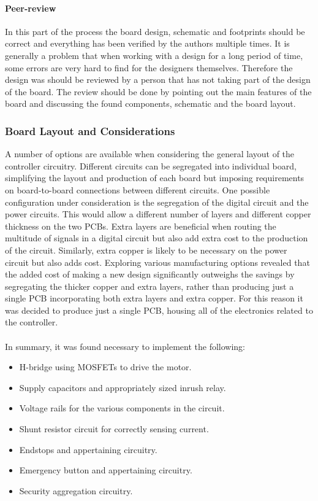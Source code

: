 \paragraph{Peer-review}
In this part of the process the board design, schematic and footprints should be correct and everything has been verified by the authors multiple times.
It is generally a problem that when working with a design for a long period of time, some errors are very hard to find for the designers themselves. 
Therefore the design was should be reviewed by a person that has not taking part of the design of the board.
The review should be done by pointing out the main features of the board and discussing the found components, schematic and the board layout.



\subsubsection{Board Layout and Considerations} %
\label{ssub:board_layout_and_considerations}
A number of options are available when considering the general layout of the controller circuitry.
Different circuits can be segregated into individual board, simplifying the layout and production of each board but imposing requirements on board-to-board connections between different circuits.
One possible configuration under consideration is the segregation of the digital circuit and the power circuits.
This would allow a different number of layers and different copper thickness on the two PCBs.
Extra layers are beneficial when routing the multitude of signals in a digital circuit but also add extra cost to the production of the circuit.
Similarly, extra copper is likely to be necessary on the power circuit but also adds cost.
Exploring various manufacturing options revealed that the added cost of making a new design significantly outweighs the savings by segregating the thicker copper and extra layers, rather than producing just a single PCB incorporating both extra layers and extra copper.
For this reason it was decided to produce just a single PCB, housing all of the electronics related to the controller.
\\~\\
In summary, it was found necessary to implement the following:
\begin{itemize}
	\item H-bridge using MOSFETs to drive the motor.
	\item Supply capacitors and appropriately sized inrush relay.
	\item Voltage rails for the various components in the circuit.
	\item Shunt resistor circuit for correctly sensing current.
	\item Endstops and appertaining circuitry.
	\item Emergency button and appertaining circuitry.
	\item Security aggregation circuitry.
\end{itemize}


